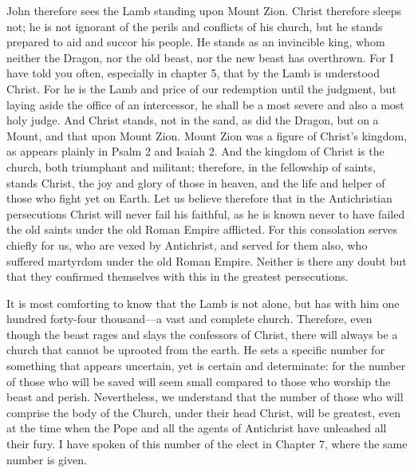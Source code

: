John therefore sees the Lamb standing upon Mount Zion. Christ therefore sleeps not; he is not ignorant of the perils and conflicts of his church, but he stands prepared to aid and succor his people. He stands as an invincible king, whom neither the Dragon, nor the old beast, nor the new beast has overthrown. For I have told you often, especially in chapter 5, that by the Lamb is understood Christ. For he is the Lamb and price of our redemption until the judgment, but laying aside the office of an intercessor, he shall be a most severe and also a most holy judge. And Christ stands, not in the sand, as did the Dragon, but on a Mount, and that upon Mount Zion. Mount Zion was a figure of Christ's kingdom, as appears plainly in Psalm 2 and Isaiah 2. And the kingdom of Christ is the church, both triumphant and militant; therefore, in the fellowship of saints, stands Christ, the joy and glory of those in heaven, and the life and helper of those who fight yet on Earth. Let us believe therefore that in the Antichristian persecutions Christ will never fail his faithful, as he is known never to have failed the old saints under the old Roman Empire afflicted. For this consolation serves chiefly for us, who are vexed by Antichrist, and served for them also, who suffered martyrdom under the old Roman Empire. Neither is there any doubt but that they confirmed themselves with this in the greatest persecutions.

It is most comforting to know that the Lamb is not alone, but has with him one hundred forty-four thousand—a vast and complete church. Therefore, even though the beast rages and slays the confessors of Christ, there will always be a church that cannot be uprooted from the earth. He sets a specific number for something that appears uncertain, yet is certain and determinate: for the number of those who will be saved will seem small compared to those who worship the beast and perish. Nevertheless, we understand that the number of those who will comprise the body of the Church, under their head Christ, will be greatest, even at the time when the Pope and all the agents of Antichrist have unleashed all their fury. I have spoken of this number of the elect in Chapter 7, where the same number is given.


